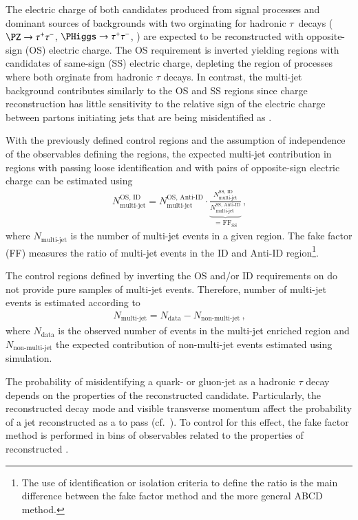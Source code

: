 The electric charge of both \tauhadvis candidates produced from signal
processes and dominant sources of backgrounds with two \tauhadvis
orginating for hadronic $\tau$~decays ($\PZ \to \tautau$,
$\PHiggs \to \tautau$, \ttbar) are expected to be reconstructed with
opposite-sign (OS) electric charge. The OS requirement is inverted
yielding regions with \tauhadvis candidates of same-sign (SS) electric
charge, depleting the region of processes where both \tauhadvis
orginate from hadronic $\tau$ decays. In contrast, the multi-jet
background contributes similarly to the OS and SS regions since
\tauhadvis charge reconstruction has little sensitivity to the
relative sign of the electric charge between partons initiating jets
that are being misidentified as \tauhadvis.

With the previously defined control regions and the assumption of
independence of the observables defining the regions, the expected
multi-jet contribution in regions with \tauhadvis passing loose
identification and with \tauhadvis pairs of opposite-sign electric
charge can be estimated using
\begin{align*}
  N_\text{multi-jet}^{\text{OS, ID}} =
  N_\text{multi-jet}^{\text{OS, Anti-ID}}
  \cdot
  \underbrace{\frac{N_\text{multi-jet}^{\text{SS, ID}}}
  {N_\text{multi-jet}^{\text{SS, Anti-ID}}}}
  _{= \text{FF}_\text{SS}} \,\text{,}
\end{align*}
where $N_\text{multi-jet}$ is the number of multi-jet events in a
given region. The fake factor (FF) measures the ratio of multi-jet
events in the ID and Anti-ID region\footnote{The use of identification
  or isolation criteria to define the ratio is the main difference
  between the fake factor method and the more general ABCD method.}.

The control regions defined by inverting the OS and/or ID requirements on
\tauhadvis do not provide pure samples of multi-jet events. Therefore,
number of multi-jet events is estimated according to
\begin{align*}
  N_\text{multi-jet} = N_\text{data} - N_\text{non-multi-jet} \,\text{,}
\end{align*}
where $N_\text{data}$ is the observed number of events in the
multi-jet enriched region and $N_\text{non-multi-jet}$ the expected
contribution of non-multi-jet events estimated using simulation.

The probability of misidentifying a quark- or gluon-jet as a hadronic
$\tau$ decay depends on the properties of the reconstructed \tauhadvis
candidate. Particularly, the reconstructed decay mode and visible
transverse momentum affect the probability of a jet reconstructed as a
\tauhadvis to pass \tauid (cf.\ ). To control for this
effect, the fake factor method is performed in bins of observables related
to the properties of reconstructed \tauhadvis.

